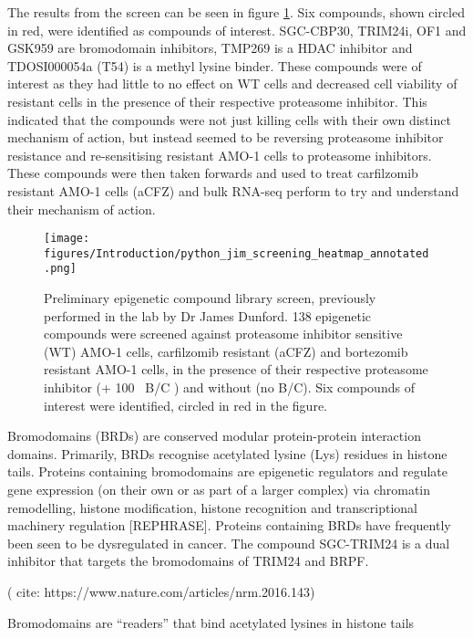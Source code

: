 The results from the screen can be seen in figure \ref{fig:compound_screen}.
Six compounds, shown circled in red, were identified as compounds of interest.
SGC-CBP30, TRIM24i, OF1 and GSK959 are bromodomain inhibitors, TMP269 is a HDAC inhibitor and TDOSI000054a (T54) is a methyl lysine binder.
These compounds were of interest as they had little to no effect on WT cells and decreased cell viability of resistant cells in the presence of their respective proteasome inhibitor.
This indicated that the compounds were not just killing cells with their own distinct mechanism of action, but instead seemed to be reversing proteasome inhibitor resistance and re-sensitising resistant AMO-1 cells to proteasome inhibitors.
These compounds were then taken forwards and used to treat carfilzomib resistant AMO-1 cells (aCFZ) and bulk RNA-seq perform to try and understand their mechanism of action.

\begin{figure}[hp]
\centering\texttt{[image: figures/Introduction/python\_jim\_screening\_heatmap\_annotated.png]}
\caption[Epigenentic compound library screen]{Preliminary epigenetic compound library screen, previously performed in the lab by Dr James Dunford.
138 epigenetic compounds were screened against proteasome inhibitor sensitive (WT) AMO-1 cells, carfilzomib resistant (aCFZ) and bortezomib resistant AMO-1 cells, in the presence of their respective proteasome inhibitor (+ 100\si{\nano\Molar} B/C ) and without (no B/C).
Six compounds of interest were identified, circled in red in the figure.}
\label{fig:compound_screen}
\end{figure}



Bromodomains (BRDs) are conserved modular protein-protein interaction domains.
Primarily, BRDs recognise acetylated lysine (Lys) residues in histone tails.
Proteins containing bromodomains are epigenetic regulators and regulate gene expression (on their own or as part of a larger complex) via chromatin remodelling, histone modification, histone recognition and transcriptional machinery regulation [REPHRASE].
Proteins containing BRDs have frequently been seen to be dysregulated in cancer.
The compound SGC-TRIM24 is a dual inhibitor that targets the bromodomains of TRIM24 and BRPF.


( cite: https://www.nature.com/articles/nrm.2016.143)


Bromodomains are ``readers'' that bind acetylated lysines in histone tails


